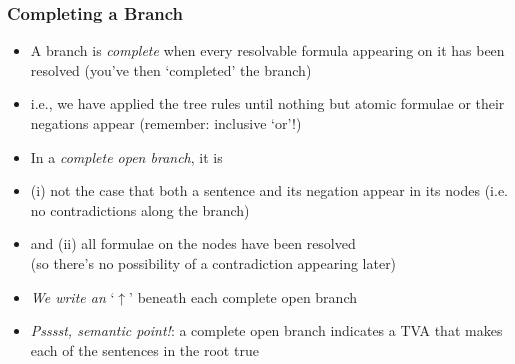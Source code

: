 \begin{frame}
\frametitle{Completing a Branch}

\begin{itemize}[<+->]

\item A branch is \emph{complete} when every resolvable formula appearing on it has been resolved (you've then `completed' the branch)

\item i.e., we have applied the tree rules until nothing but atomic formulae or their negations appear (remember: inclusive `or'!)

\medskip

\item In a \emph{complete open branch}, it is 

\bi 

\item (i) not the case that both a sentence and its negation appear in its nodes (i.e. no contradictions along the branch) 

\item and (ii) all formulae on the nodes have been resolved \\ (so there's no possibility of a contradiction appearing later)

\item \emph{We write an} `\emph{$\uparrow$}' beneath each complete open branch

\ei

\bigskip

\item \textit{Psssst, semantic point!}: a complete open branch indicates a TVA that makes each of the sentences in the root true 


\end{itemize}
\end{frame}

